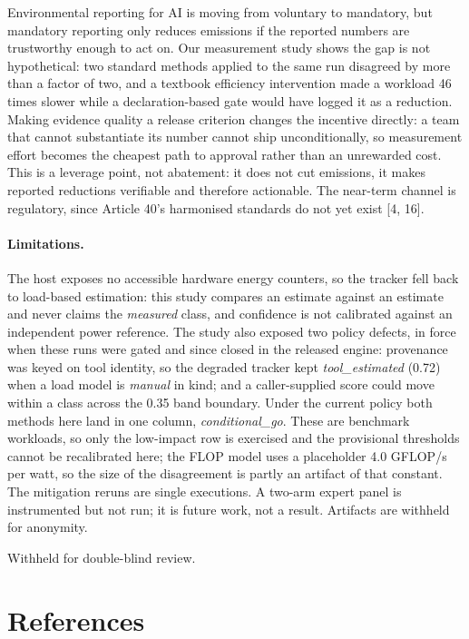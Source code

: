 \documentclass{article}
\begin{document}
Environmental reporting for AI is moving from voluntary to mandatory, but
mandatory reporting only reduces emissions if the reported numbers are
trustworthy enough to act on. Our measurement study shows the gap is not
hypothetical: two standard methods applied to the same run disagreed by more
than a factor of two, and a textbook efficiency intervention made a workload 46
times slower while a declaration-based gate would have logged it as a
reduction. Making evidence quality a release criterion changes the incentive directly: a
team that cannot substantiate its number cannot ship unconditionally, so
measurement effort becomes the cheapest path to approval rather than an
unrewarded cost. This is a leverage point, not abatement: it does not cut
emissions, it makes reported reductions verifiable and therefore actionable.
The near-term channel is regulatory, since Article 40's harmonised standards do
not yet exist [4, 16].

\paragraph{Limitations.} The host exposes no accessible hardware energy
counters, so the tracker fell back to load-based estimation: this study
compares an estimate against an estimate and never claims the \emph{measured}
class, and confidence is not calibrated against an independent power
reference. The study also exposed two policy defects, in force when these runs
were gated and since closed in the released engine: provenance was keyed on
tool identity, so the degraded tracker kept \emph{tool\_estimated} (0.72) when
a load model is \emph{manual} in kind; and a caller-supplied score could move
within a class across the 0.35 band boundary. Under the current policy both
methods here land in one column, \emph{conditional\_go}. These are
benchmark workloads, so only the low-impact row is exercised and the
provisional thresholds cannot be recalibrated here; the FLOP model uses a
placeholder 4.0 GFLOP/s per watt, so the size of the disagreement is partly an
artifact of that constant. The mitigation reruns are single executions. A
two-arm expert panel is instrumented but not run; it is future work, not a
result. Artifacts are withheld for anonymity.


\begin{ack}
Withheld for double-blind review.
\end{ack}

\section*{References}
\end{document}
